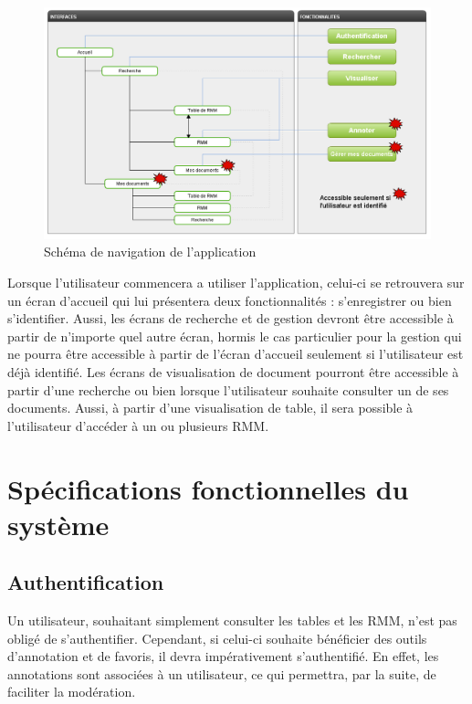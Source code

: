 \documentclass[a4paper]{article}
\begin{document}
\begin{figure}[H]
\centering
\includegraphics[width=\textwidth]{navigation.png}
\caption{Schéma de navigation de l'application}
\label{fig:navigation}
\end{figure}

Lorsque l’utilisateur commencera a utiliser l’application, celui-ci se retrouvera sur un écran d’accueil qui lui présentera deux fonctionnalités : s’enregistrer ou bien s’identifier. Aussi, les écrans de recherche et de gestion devront être accessible à partir de n’importe quel autre écran, hormis le cas particulier pour la gestion qui ne pourra être accessible à partir de l’écran d’accueil seulement si l’utilisateur est déjà identifié. Les écrans de visualisation de document pourront être accessible à partir d’une recherche ou bien lorsque l’utilisateur souhaite consulter un de ses documents. Aussi, à partir d’une visualisation de table, il sera possible à l’utilisateur d’accéder à un ou plusieurs RMM.

\section{Spécifications fonctionnelles du système}

\subsection{Authentification}

Un utilisateur, souhaitant simplement consulter les tables et les RMM, n'est pas obligé de s'authentifier. Cependant, si celui-ci souhaite bénéficier des outils d'annotation et de favoris, il devra impérativement s'authentifié. En effet, les annotations sont associées à un utilisateur, ce qui permettra, par la suite, de faciliter la modération.
\end{document}
